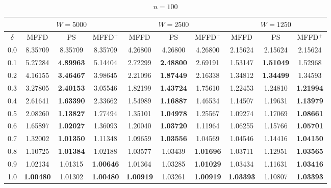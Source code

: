 \documentclass[oribibl]{llncs}
\begin{document}
\begin{table}[!htb]
	\centering
	\caption{$n = 100$}
	\begin{tabular}{c@{\hspace{15pt}}c@{\hspace{10pt}}c@{\hspace{10pt}}c@{\hspace{7pt}}| @{\hspace{7pt}}c@{\hspace{10pt}}c@{\hspace{10pt}}c@{\hspace{7pt}}| @{\hspace{7pt}} c@{\hspace{10pt}}c@{\hspace{10pt}}c}
		\noalign{\smallskip}
		& \multicolumn{3}{c}{$W = 5000$} & \multicolumn{3}{c}{$W = 2500$} & \multicolumn{3}{c}{$W = 1250$} \\
		\hline\noalign{\smallskip}
		$\delta$ & MFFD & PS & MFFD$^+$ & MFFD & PS & MFFD$^+$ & MFFD & PS & MFFD$^+$ \\
		\noalign{\smallskip}
		\hline 
		\noalign{\smallskip}
		0.0	& 8.35709 & 8.35709 & 8.35709 & 4.26800 & 4.26800 & 4.26800 & 2.15624 & 2.15624 & 2.15624 \\
		0.1	& 5.27284 & \textbf{4.89963} & 5.14404 & 2.72299 & \textbf{2.48800} & 2.69191 & 1.53147 & \textbf{1.51049} & 1.52968 \\
		0.2	& 4.16155 & \textbf{3.46467} & 3.98645 & 2.21096 & \textbf{1.87449} & 2.16338 & 1.34812 & \textbf{1.34499} & 1.34593 \\
		0.3	& 3.27805 & \textbf{2.40153} & 3.05546 & 1.82199 & \textbf{1.43724} & 1.75610 & 1.22453 & 1.24810 & \textbf{1.21994} \\
		0.4	& 2.61641 & \textbf{1.63390} & 2.33662 & 1.54989 & \textbf{1.16887} & 1.46534 & 1.14507 & 1.19631 & \textbf{1.13979} \\
		0.5	& 2.08260 & \textbf{1.13827} & 1.77494 & 1.35101 & \textbf{1.04978} & 1.25567 & 1.09274 & 1.17069 & \textbf{1.08661} \\
		0.6	& 1.65897 & \textbf{1.02027} & 1.36093 & 1.20040 & \textbf{1.03720} & 1.11964 & 1.06255 & 1.15766 & \textbf{1.05701} \\
		0.7	& 1.32002 & \textbf{1.01350} & 1.11348 & 1.09659 & \textbf{1.03556} & 1.04569 & 1.04546 & 1.14416 & \textbf{1.04150} \\
		0.8	& 1.10725 & \textbf{1.01384} & 1.02188 & 1.03577 & 1.03439 & \textbf{1.01696} & 1.03711 & 1.12951 & \textbf{1.03565} \\
		0.9	& 1.02134 & 1.01315 & \textbf{1.00646} & 1.01364 & 1.03285 & \textbf{1.01029} & 1.03434 & 1.11631 & \textbf{1.03416} \\
		1.0 & \textbf{1.00480} & 1.01302 & \textbf{1.00480} & \textbf{1.00919} & 1.03261 & \textbf{1.00919} & \textbf{1.03393} & 1.10807 & \textbf{1.03393} \\	
		\hline
	\end{tabular}
	\label{table:n100}
\end{table}
\end{document}
